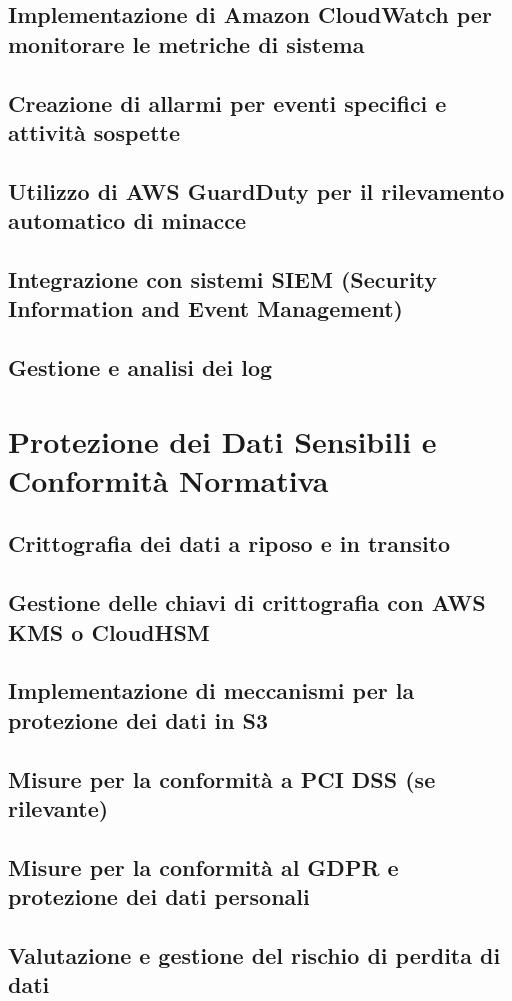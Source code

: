 \documentclass[a4paper,12pt]{report}
\begin{document}
\section{Implementazione di Amazon CloudWatch per monitorare le metriche di sistema}
\section{Creazione di allarmi per eventi specifici e attività sospette}
\section{Utilizzo di AWS GuardDuty per il rilevamento automatico di minacce}
\section{Integrazione con sistemi SIEM (Security Information and Event Management)}
\section{Gestione e analisi dei log}

\chapter{Protezione dei Dati Sensibili e Conformità Normativa}
\section{Crittografia dei dati a riposo e in transito}
\section{Gestione delle chiavi di crittografia con AWS KMS o CloudHSM}
\section{Implementazione di meccanismi per la protezione dei dati in S3}
\section{Misure per la conformità a PCI DSS (se rilevante)}
\section{Misure per la conformità al GDPR e protezione dei dati personali}
\section{Valutazione e gestione del rischio di perdita di dati}
\end{document}
